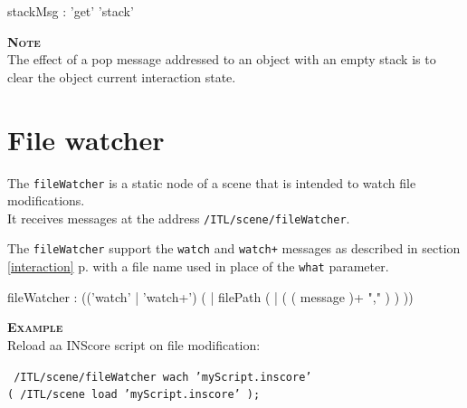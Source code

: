 \documentclass[a4paper,twoside]{report}
\newcommand{\sublevel}[1]	{\section{#1}}
\newcommand{\fullref}[1]	{\ref{#1} p.\pageref{#1}}
\newcommand{\OSC}[1]		{\texttt{#1}}
\newcommand{\example}		{\textbf{\hspace{-1.5cm}\textbf{\textsc{Example }}}}
\newcommand{\note}	[1]		{\vspace{2mm}\textbf{\hspace{-0.9cm}\textbf{\textsc{Note #1}}}}
\let\olditemize\itemize
\let\oldenditemize\enditemize
\renewenvironment{itemize} 	{\olditemize \setlength{\itemsep}{1mm}}{\oldenditemize}
\newcommand{\sample}	[1]			{\vspace{-2mm}\begin{center}\colorbox{mygrey}{
								\begin{minipage}[t]{0.9\columnwidth} 
								{\small \texttt{#1}}
								\end{minipage}}\end{center}}
\begin{document}
\begin{rail} 
stackMsg : 'get' 'stack'
\end{rail}

\note{} \\
The effect of a pop message addressed to an object with an empty stack is to clear the object current interaction state.


\sublevel{File watcher}
\label{filewatch}

The \OSC{fileWatcher} is a static node of a scene that is intended to watch file modifications. \\
It receives messages at the address \OSC{/ITL/scene/fileWatcher}.

The \OSC{fileWatcher} support the \OSC{watch} and \OSC{watch+} messages as described in section \fullref{interaction} with a file name used in place of the \OSC{what} parameter.

\begin{rail}
fileWatcher : (('watch' | 'watch+')  ( | filePath  ( |  ( ( message  )+ "," ) )  )) 
\end{rail}

\example \\
Reload aa INScore script on file modification:
\sample{
/ITL/scene/fileWatcher wach 'myScript.inscore' \\
\hspace*{3cm}( /ITL/scene load 'myScript.inscore' );
}

%
%
%
\end{document}
